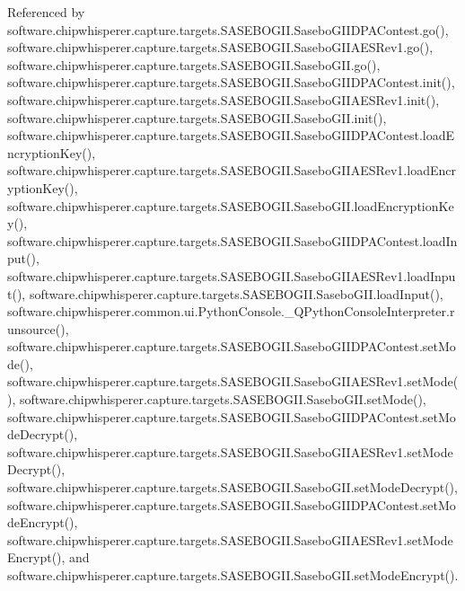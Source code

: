 Referenced by software.\+chipwhisperer.\+capture.\+targets.\+S\+A\+S\+E\+B\+O\+G\+I\+I.\+Sasebo\+G\+I\+I\+D\+P\+A\+Contest.\+go(), software.\+chipwhisperer.\+capture.\+targets.\+S\+A\+S\+E\+B\+O\+G\+I\+I.\+Sasebo\+G\+I\+I\+A\+E\+S\+Rev1.\+go(), software.\+chipwhisperer.\+capture.\+targets.\+S\+A\+S\+E\+B\+O\+G\+I\+I.\+Sasebo\+G\+I\+I.\+go(), software.\+chipwhisperer.\+capture.\+targets.\+S\+A\+S\+E\+B\+O\+G\+I\+I.\+Sasebo\+G\+I\+I\+D\+P\+A\+Contest.\+init(), software.\+chipwhisperer.\+capture.\+targets.\+S\+A\+S\+E\+B\+O\+G\+I\+I.\+Sasebo\+G\+I\+I\+A\+E\+S\+Rev1.\+init(), software.\+chipwhisperer.\+capture.\+targets.\+S\+A\+S\+E\+B\+O\+G\+I\+I.\+Sasebo\+G\+I\+I.\+init(), software.\+chipwhisperer.\+capture.\+targets.\+S\+A\+S\+E\+B\+O\+G\+I\+I.\+Sasebo\+G\+I\+I\+D\+P\+A\+Contest.\+load\+Encryption\+Key(), software.\+chipwhisperer.\+capture.\+targets.\+S\+A\+S\+E\+B\+O\+G\+I\+I.\+Sasebo\+G\+I\+I\+A\+E\+S\+Rev1.\+load\+Encryption\+Key(), software.\+chipwhisperer.\+capture.\+targets.\+S\+A\+S\+E\+B\+O\+G\+I\+I.\+Sasebo\+G\+I\+I.\+load\+Encryption\+Key(), software.\+chipwhisperer.\+capture.\+targets.\+S\+A\+S\+E\+B\+O\+G\+I\+I.\+Sasebo\+G\+I\+I\+D\+P\+A\+Contest.\+load\+Input(), software.\+chipwhisperer.\+capture.\+targets.\+S\+A\+S\+E\+B\+O\+G\+I\+I.\+Sasebo\+G\+I\+I\+A\+E\+S\+Rev1.\+load\+Input(), software.\+chipwhisperer.\+capture.\+targets.\+S\+A\+S\+E\+B\+O\+G\+I\+I.\+Sasebo\+G\+I\+I.\+load\+Input(), software.\+chipwhisperer.\+common.\+ui.\+Python\+Console.\+\_\+\+Q\+Python\+Console\+Interpreter.\+runsource(), software.\+chipwhisperer.\+capture.\+targets.\+S\+A\+S\+E\+B\+O\+G\+I\+I.\+Sasebo\+G\+I\+I\+D\+P\+A\+Contest.\+set\+Mode(), software.\+chipwhisperer.\+capture.\+targets.\+S\+A\+S\+E\+B\+O\+G\+I\+I.\+Sasebo\+G\+I\+I\+A\+E\+S\+Rev1.\+set\+Mode(), software.\+chipwhisperer.\+capture.\+targets.\+S\+A\+S\+E\+B\+O\+G\+I\+I.\+Sasebo\+G\+I\+I.\+set\+Mode(), software.\+chipwhisperer.\+capture.\+targets.\+S\+A\+S\+E\+B\+O\+G\+I\+I.\+Sasebo\+G\+I\+I\+D\+P\+A\+Contest.\+set\+Mode\+Decrypt(), software.\+chipwhisperer.\+capture.\+targets.\+S\+A\+S\+E\+B\+O\+G\+I\+I.\+Sasebo\+G\+I\+I\+A\+E\+S\+Rev1.\+set\+Mode\+Decrypt(), software.\+chipwhisperer.\+capture.\+targets.\+S\+A\+S\+E\+B\+O\+G\+I\+I.\+Sasebo\+G\+I\+I.\+set\+Mode\+Decrypt(), software.\+chipwhisperer.\+capture.\+targets.\+S\+A\+S\+E\+B\+O\+G\+I\+I.\+Sasebo\+G\+I\+I\+D\+P\+A\+Contest.\+set\+Mode\+Encrypt(), software.\+chipwhisperer.\+capture.\+targets.\+S\+A\+S\+E\+B\+O\+G\+I\+I.\+Sasebo\+G\+I\+I\+A\+E\+S\+Rev1.\+set\+Mode\+Encrypt(), and software.\+chipwhisperer.\+capture.\+targets.\+S\+A\+S\+E\+B\+O\+G\+I\+I.\+Sasebo\+G\+I\+I.\+set\+Mode\+Encrypt().


